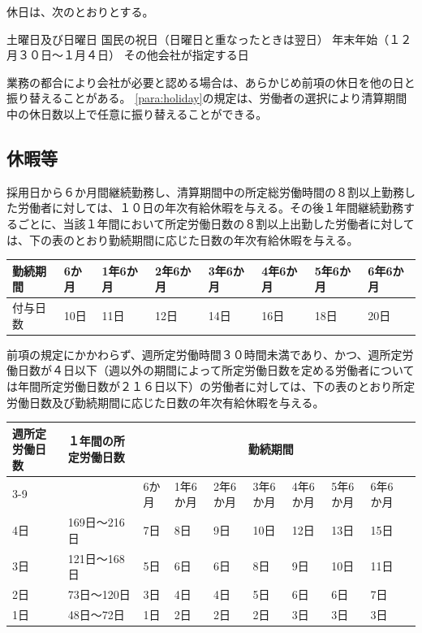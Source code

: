 \documentclass[10pt,a4paper]{jsarticle}
\begin{document}
休日は、次のとおりとする。
\label{para:holiday}
\begin{enumerate}
    \itm 土曜日及び日曜日
    \itm 国民の祝日（日曜日と重なったときは翌日）
    \itm 年末年始（１２月３０日～１月４日）
    \itm その他会社が指定する日
\end{enumerate}
\term
業務の都合により会社が必要と認める場合は、あらかじめ前項の休日を他の日と振り替えることがある。
\term
\ref{para:holiday}の規定は、労働者の選択により清算期間中の休日数以上で任意に振り替えることができる。


\subsection{休暇等}
採用日から６か月間継続勤務し、清算期間中の所定総労働時間の８割以上勤務した労働者に対しては、１０日の年次有給休暇を与える。その後１年間継続勤務するごとに、当該１年間において所定労働日数の８割以上出勤した労働者に対しては、下の表のとおり勤続期間に応じた日数の年次有給休暇を与える。

\hspace{2cm}\begin{tabular}{|l|p{2.5em}|p{2.5em}|p{2.5em}|p{2.5em}|p{2.5em}|p{2.5em}|p{2.5em}|} \hline
  勤続期間 & 6か月 & 1年6か月& 2年6か月& 3年6か月& 4年6か月& 5年6か月& 6年6か月 \\ \hline \hline
  付与日数 & 10日 & 11日& 12日& 14日& 16日& 18日& 20日 \\ \hline
\end{tabular}

\label{para:paid_vacation}
\term
前項の規定にかかわらず、週所定労働時間３０時間未満であり、かつ、週所定労働日数が４日以下（週以外の期間によって所定労働日数を定める労働者については年間所定労働日数が２１６日以下）の労働者に対しては、下の表のとおり所定労働日数及び勤続期間に応じた日数の年次有給休暇を与える。

\hspace{2cm}\begin{tabular}{|p{3em}|p{6.5em}|p{2.5em}|p{2.5em}|p{2.5em}|p{2.5em}|p{2.5em}|p{2.5em}|p{2.5em}|p{2.5em}|} \hline
  週所定労働日数 & １年間の所定労働日数 & \multicolumn{7}{|c|}{勤続期間} \\ \cline{3-9}
  & & 6か月 & 1年6か月& 2年6か月& 3年6か月& 4年6か月& 5年6か月& 6年6か月 \\ \hline \hline
  4日 & 169日～216日 & 7日 & 8日& 9日& 10日& 12日& 13日& 15日 \\ \hline
  3日 & 121日～168日 & 5日 & 6日& 6日&  8日&  9日& 10日& 11日 \\ \hline
  2日 & 73日～120日  & 3日 & 4日& 4日&  5日&  6日&  6日&  7日 \\ \hline
  1日 & 48日～72日   & 1日 & 2日& 2日&  2日&  3日&  3日&  3日 \\ \hline
\end{tabular}
\end{document}
